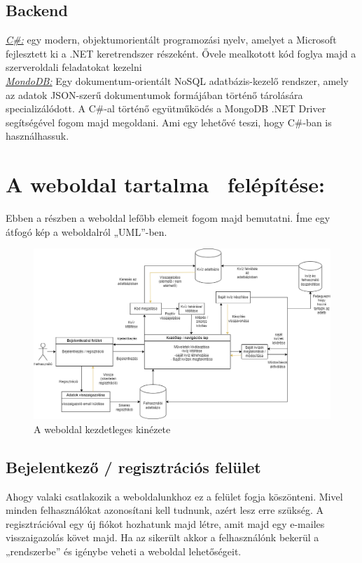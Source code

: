 \documentclass[a4paper,12pt]{article}
\begin{document}
\subsection{Backend}
\textit{\underline{C\#:}} egy modern, objektumorientált programozási nyelv, amelyet a Microsoft fejlesztett ki a .NET keretrendszer részeként. Ővele mealkotott kód foglya majd a szerveroldali feladatokat kezelni \bigskip
\\\textit{\underline{MondoDB:}} Egy dokumentum-orientált NoSQL adatbázis-kezelő rendszer, amely az adatok JSON-szerű dokumentumok formájában történő tárolására specializálódott. A C\#-al történő együtműködés a MongoDB .NET Driver segítségével fogom majd megoldani. Ami egy lehetővé teszi, hogy C\#-ban is használhassuk.

\section{A weboldal tartalma \ felépítése:}
Ebben a részben a weboldal lefőbb elemeit fogom majd bemutatni. Íme egy átfogó kép a weboldalról „UML”-ben.
\begin{figure}[h]
    \centering
    \includegraphics[width=1\textwidth]{web.png}
    \caption{A weboldal kezdetleges kinézete}
    \label{fig:A weboldal kezdetleges kinézete}
\end{figure}

\subsection{Bejelentkező / regisztrációs felület}
Ahogy valaki csatlakozik a weboldalunkhoz ez a felület fogja köszönteni. Mivel minden felhasználókat azonosítani kell tudnunk, azért lesz erre szükség. A regisztrációval egy új fiókot hozhatunk majd létre, amit majd egy e-mailes visszaigazolás követ majd. Ha az sikerült akkor a felhasználónk bekerül a „rendszerbe” és igénybe veheti a weboldal lehetőségeit.
\end{document}
